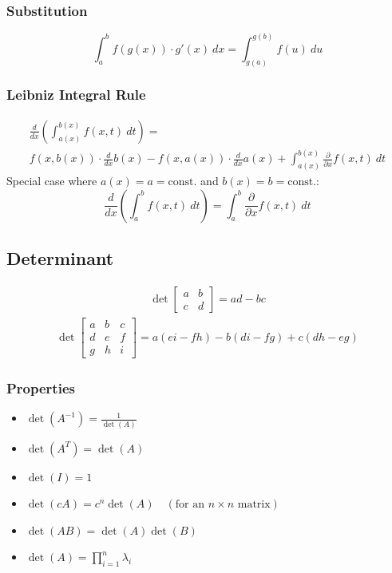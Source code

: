 \subsubsection{Substitution}
\begin{equation*}
    \int_a^b f(g(x))\cdot g'(x)\ dx = \int_{g(a)}^{g(b)}f(u)\ du
\end{equation*}

\subsubsection{Leibniz Integral Rule}
\begin{multline*}
    \frac{d}{dx}\left(\int_{a(x)}^{b(x)}f(x,t)\ dt\right)
    =
    \\
    f(x,b(x))\cdot\frac{d}{dx}b(x)
    -f(x,a(x))\cdot\frac{d}{dx}a(x)
    +\int_{a(x)}^{b(x)}\frac{\partial}{\partial x}f(x,t)\ dt
\end{multline*}
Special case where $a(x)=a=\mathrm{const.}$ and $b(x)=b=\mathrm{const.}$:
\begin{equation*}
    \frac{d}{dx}\left(\int_a^b f(x,t)\ dt\right)
    =\int_a^b\frac{\partial}{\partial x}f(x,t)\ dt
\end{equation*}

\subsection{Determinant}

\begin{align*}
	\det
	\begin{bmatrix}
		a & b \\
		c & d
	\end{bmatrix}
	=
	ad-bc
\end{align*}
\begin{align*}
	\det
	\begin{bmatrix}
		a & b & c \\
		d & e & f \\
		g & h & i
	\end{bmatrix}
	=
	a(ei-fh)-b(di-fg)+c(dh-eg)
\end{align*}

\subsubsection{Properties}
\begin{itemize}
	\item $\det\left(A^{-1}\right) = \frac{1}{\det(A)}$
	\item $\det(A^T) = \det(A)$
	\item $\det(I) = 1$
	\item $\det(cA) = c^n\det(A)\quad(\text{for an }n\times n\text{ matrix})$
	\item $\det(AB) = \det(A)\det(B)$
	\item $\det(A) = \prod_{i=1}^n \lambda_i$
\end{itemize}

